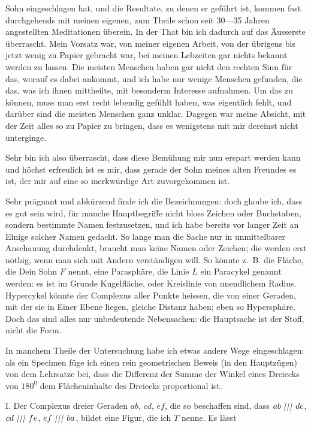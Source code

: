 %
Sohn eingeschlagen hat, und die Resultate, zu denen er geführt ist, kommen fast durchgehends mit meinen eigenen, zum Theile schon seit 30—35 Jahren angestellten Meditationen überein. In der That bin ich dadurch auf das Äusserste überrascht. Mein Vorsatz war, von meiner eigenen Arbeit, von der übrigens bis jetzt wenig zu Papier gebracht war, bei meinen Lebzeiten gar nichts bekannt werden zu lassen. Die meisten Menschen haben gar nicht den rechten Sinn für das, worauf es dabei ankommt, und ich habe nur wenige Menschen gefunden, die das, was ich ihnen mittheilte, mit besonderm Interesse aufnahmen. Um das zu können, muss man erst recht lebendig gefühlt haben, was eigentlich fehlt, und darüber sind die meisten Menschen ganz unklar. Dagegen war meine Absicht, mit der Zeit alles so zu Papier zu bringen, dass es wenigstens mit mir dereinst nicht unterginge.

Sehr bin ich also überrascht, dass diese Bemühung mir nun erspart werden kann und höchst erfreulich ist es mir, dass gerade der Sohn meines alten Freundes es ist, der mir auf eine so merkwürdige Art zuvorgekommen ist.

Sehr prägnant und abkürzend finde ich die Bezeichnungen: doch glaube ich, dass es gut sein wird, für manche Hauptbegriffe nicht bloss Zeichen oder Buchstaben, sondern bestimmte Namen festzusetzen, und ich habe bereits vor langer Zeit an Einige solcher Namen gedacht. So lange man die Sache nur in unmittelbarer Anschauung durchdenkt, braucht man keine Namen oder Zeichen; die werden erst nöthig, wenn man sich mit Andern verständigen will. So könnte z.~B. die Fläche, die Dein Sohn $F$ nennt, eine Parasphäre, die Linie $L$ ein Paracykel genannt werden: es ist im Grunde Kugelfläche, oder Kreislinie von unendlichem Radius. Hypercykel könnte der Complexus aller Punkte heissen, die von einer Geraden, mit der sie in Einer Ebene liegen, gleiche Distanz haben; eben so Hypersphäre. Doch das sind alles nur unbedeutende Nebensachen: die Hauptsache ist der Stoff, nicht die Form.

In manchem Theile der Untersuchung habe ich etwas andere Wege eingeschlagen: als ein Specimen füge ich einen rein geometrischen Beweis (in den Hauptzügen) von dem Lehrsatze bei, dass die Differenz der Summe der Winkel eines Dreiecks von $180^{0}$ dem Flächeninhalte des Dreiecks proportional ist.

I. Der Complexus dreier Geraden $ab$, $cd$, $ef$, die so beschaffen sind, dass $ab\TripleParallel dc$, $cd\TripleParallel fe$, $ef\TripleParallel ba$, bildet eine Figur, die ich $T$ nenne. Es lässt
